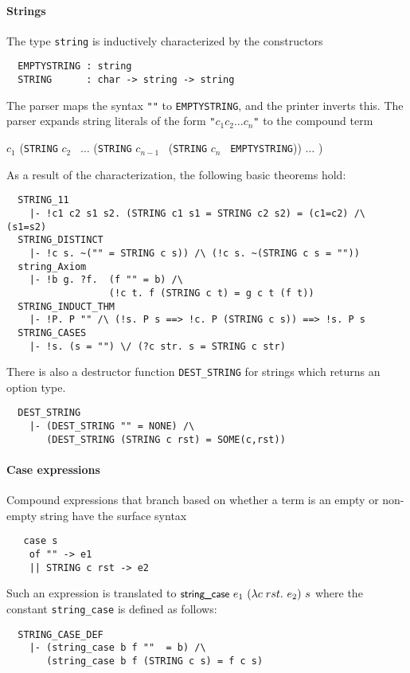 \paragraph {Strings}

The type \verb+string+ is inductively characterized by the
constructors
%
{\small
\begin{verbatim}
  EMPTYSTRING : string
  STRING      : char -> string -> string
\end{verbatim}
}
%
The \HOL{} parser maps the syntax \verb+""+ to
{\small\verb+EMPTYSTRING+}, and the \HOL{} printer inverts this.
The parser expands string literals of the form \verb+"+$c_1 c_2
\ldots c_n$\verb+"+ to the compound term

\smallskip

 $c_1$ ({\small\verb+STRING+} $c_2$ \
$\ldots$ ({\small\verb+STRING+} $c_{n-1}$ \ ({\small\verb+STRING+}
$c_n$ \ {\small\verb+EMPTYSTRING+})) $\ldots$ )

\smallskip

\noindent As a result of the characterization, the following basic theorems
hold:
%
{\small
\begin{verbatim}
  STRING_11
    |- !c1 c2 s1 s2. (STRING c1 s1 = STRING c2 s2) = (c1=c2) /\ (s1=s2)
  STRING_DISTINCT
    |- !c s. ~("" = STRING c s)) /\ (!c s. ~(STRING c s = ""))
  string_Axiom
    |- !b g. ?f.  (f "" = b) /\
                  (!c t. f (STRING c t) = g c t (f t))
  STRING_INDUCT_THM
    |- !P. P "" /\ (!s. P s ==> !c. P (STRING c s)) ==> !s. P s
  STRING_CASES
    |- !s. (s = "") \/ (?c str. s = STRING c str)
\end{verbatim}
}
%
There is also a destructor function {\small\verb+DEST_STRING+} for
strings which returns an option type.
{\small
\begin{verbatim}
  DEST_STRING
    |- (DEST_STRING "" = NONE) /\
       (DEST_STRING (STRING c rst) = SOME(c,rst))
\end{verbatim}
}


\paragraph{Case expressions}

Compound \HOL{} expressions that branch based on
whether a term is an empty or non-empty string have the
surface syntax
%
{\small
\begin{verbatim}
   case s
    of "" -> e1
    || STRING c rst -> e2
\end{verbatim}}
%
Such an expression is translated to
$\konst{string\_case}\ e_1 \ (\lambda c\; rst.\ e_2)\ s$ where the constant
{\small\verb+string_case+} is defined as follows:
%
{\small
\begin{verbatim}
  STRING_CASE_DEF
    |- (string_case b f ""  = b) /\
       (string_case b f (STRING c s) = f c s)
\end{verbatim}}

